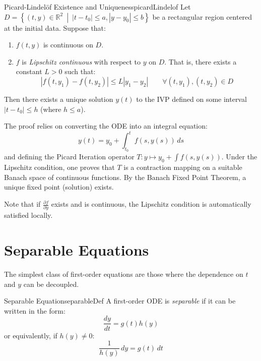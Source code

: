 \documentclass{book}
\newenvironment{Proof}[1][]
  {\begin{ProofTcb}[#1]}
  {\end{ProofTcb}}
\newcommand{\R}{{\mathbb{R}}}
\newcommand{\set}[2]{\left\{#1 \ \middle|\ #2\right\}}
\begin{document}
\begin{thm}{Picard-Lindelöf Existence and Uniqueness}{picardLindelof}
    Let $D = \set{(t,y) \in \R^2}{|t - t_0| \le a, |y - y_0| \le b}$ be a rectangular region centered at the initial data. Suppose that:
    \begin{enumerate}
        \item $f(t,y)$ is continuous on $D$.
        \item $f$ is \emph{Lipschitz continuous} with respect to $y$ on $D$. That is, there exists a constant $L > 0$ such that:
        \[
            |f(t, y_1) - f(t, y_2)| \le L|y_1 - y_2| \qquad \forall (t, y_1), (t, y_2) \in D
        \]
    \end{enumerate}
    Then there exists a unique solution $y(t)$ to the IVP defined on some interval $|t - t_0| \le h$ (where $h \le a$).
\end{thm}

\begin{Proof}
    The proof relies on converting the ODE into an integral equation:
    \[
        y(t) = y_0 + \int_{t_0}^t f(s, y(s)) \, ds
    \]
    and defining the Picard Iteration operator $T: y \mapsto y_0 + \int f(s, y(s))$. Under the Lipschitz condition, one proves that $T$ is a contraction mapping on a suitable Banach space of continuous functions. By the Banach Fixed Point Theorem, a unique fixed point (solution) exists.
\end{Proof}

Note that if $\frac{\partial f}{\partial y}$ exists and is continuous, the Lipschitz condition is automatically satisfied locally.

\section{Separable Equations}\label{sec:separable}

The simplest class of first-order equations are those where the dependence on $t$ and $y$ can be decoupled.

\begin{defn}{Separable Equation}{separableDef}
    A first-order ODE is \emph{separable} if it can be written in the form:
    \[
        \frac{dy}{dt} = g(t)h(y)
    \]
    or equivalently, if $h(y) \ne 0$:
    \begin{equation}\label{eq:separatedForm}
        \frac{1}{h(y)} \, dy = g(t) \, dt
    \end{equation}
\end{defn}
\end{document}
